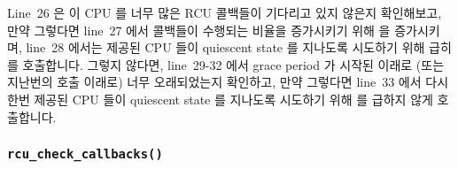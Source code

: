 Line~26 은 이 CPU 를 너무 많은 RCU 콜백들이 기다리고 있지 않은지 확인해보고,
만약 그렇다면 line~27 에서 콜백들이 수행되는 비율을 증가시키기 위해
 을 증가시키며, line~28 에서는 제공된 CPU 들이 quiescent state 를
지나도록 시도하기 위해 급히  를 호출합니다.
그렇지 않다면, line~29-32 에서 grace period 가 시작된 이래로 (또는 지난번의
 호출 이래로) 너무 오래되었는지 확인하고, 만약
그렇다면 line~33 에서 다시한번 제공된 CPU 들이 quiescent state 를 지나도록
시도하기 위해  를 급하지 않게 호출합니다.
\iffalse

Lines~16 and 17 enqueue the new callback.
Lines 18 and 19 check to see there is a grace period in progress,
and, if not, line~23 acquires the root \co{rcu_node} structure's
lock and line~24 invokes \co{rcu_start_gp()} to start a new grace
period (and also to release the lock).

Line~26 checks to see if too many RCU callbacks are waiting on
this CPU, and, if so, line~27 increases \co{->blimit} in order
to increase the rate at which callbacks are processed, while
line~28 invokes \co{force_quiescent_state()} urgently in order to
try to convince holdout CPUs to pass through quiescent states.
Otherwise, lines~29-32 check to see if it has been too long since
the grace period started (or since the last call to
\co{force_quiescent_state()}, as the case may be), and, if so,
line~33 invokes \co{force_quiescent_state()} non-urgently, again
to convince holdout CPUs to pass through quiescent states.
\fi

\subsubsection{\tt rcu\_check\_callbacks()}
\label{app:rcuimpl:rcutreewt:rcu-check-callbacks}

